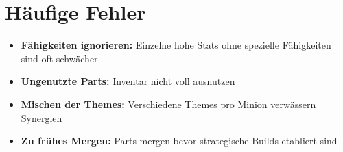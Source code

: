\section{Häufige Fehler}

\begin{itemize}
    \item \textbf{Fähigkeiten ignorieren:} Einzelne hohe Stats ohne spezielle Fähigkeiten sind oft schwächer
    \item \textbf{Ungenutzte Parts:} Inventar nicht voll ausnutzen
    \item \textbf{Mischen der Themes:} Verschiedene Themes pro Minion verwässern Synergien
    \item \textbf{Zu frühes Mergen:} Parts mergen bevor strategische Builds etabliert sind
\end{itemize}
